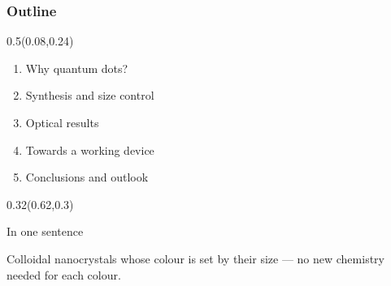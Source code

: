 \documentclass[aspectratio=169]{beamer}
\begin{document}
\begin{frame}[t]
  \frametitle{Outline}

\begin{textblock}{0.5}(0.08,0.24)
{\raggedright\fontsize{20}{24}\selectfont \begin{enumerate}
\item Why quantum dots?
\item Synthesis and size control
\item Optical results
\item Towards a working device
\item Conclusions and outlook
\end{enumerate}\par}
\end{textblock}

\begin{textblock}{0.32}(0.62,0.3)
{\begin{exampleblock}{In one sentence}\raggedright\fontsize{15}{18}\selectfont Colloidal nanocrystals whose colour is set by their size — no new chemistry needed for each colour.\end{exampleblock}\par}
\end{textblock}
\end{frame}
\end{document}
